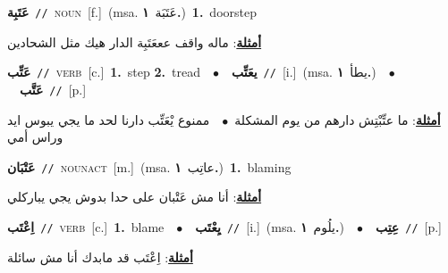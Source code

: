 \documentclass[10pt,a4paper,twoside]{article} %
\begin{document}
\begin{multicols}{2}
{{{{{{{{{{\setlength\topsep{0pt}\textbf{\foreignlanguage{arabic}{عَتَبِة}}\ {\color{gray}\texttt{//}\color{black}}\ \textsc{noun}\ [f.]\ \color{gray}(msa. \foreignlanguage{arabic}{عَتَبَة}~\foreignlanguage{arabic}{\textbf{١.}})\color{black}\ \textbf{1.}~doorstep\  \begin{flushright}\color{gray}\foreignlanguage{arabic}{\textbf{\underline{\foreignlanguage{arabic}{أمثلة}}}: ماله واقف عععَتَبِة الدار هيك مثل الشحادين}\end{flushright}\color{black}} \vspace{2mm}

{\setlength\topsep{0pt}\textbf{\foreignlanguage{arabic}{عَتِّب}}\ {\color{gray}\texttt{//}\color{black}}\ \textsc{verb}\ [c.]\ \textbf{1.}~step  \textbf{2.}~tread\ \ $\bullet$\ \ \setlength\topsep{0pt}\textbf{\foreignlanguage{arabic}{يعَتِّب}}\ {\color{gray}\texttt{//}\color{black}}\ [i.]\ \color{gray}(msa. \foreignlanguage{arabic}{يطأ}~\foreignlanguage{arabic}{\textbf{١.}})\color{black}\ \ $\bullet$\ \ \setlength\topsep{0pt}\textbf{\foreignlanguage{arabic}{عَتَّب}}\ {\color{gray}\texttt{//}\color{black}}\ [p.]\  \begin{flushright}\color{gray}\foreignlanguage{arabic}{\textbf{\underline{\foreignlanguage{arabic}{أمثلة}}}: ما عتِّبْتِش دارهم من يوم المشكلة\ $\bullet$\ \  ممنوع يْعَتِّب دارنا لحد ما يجي يبوس ايد وراس أمي}\end{flushright}\color{black}} \vspace{2mm}

{\setlength\topsep{0pt}\textbf{\foreignlanguage{arabic}{عَتْبَان}}\ {\color{gray}\texttt{//}\color{black}}\ \textsc{noun\textunderscore act}\ [m.]\ \color{gray}(msa. \foreignlanguage{arabic}{عاتِب}~\foreignlanguage{arabic}{\textbf{١.}})\color{black}\ \textbf{1.}~blaming\  \begin{flushright}\color{gray}\foreignlanguage{arabic}{\textbf{\underline{\foreignlanguage{arabic}{أمثلة}}}: أنا مش عَتْبان على حدا بدوش يجي يباركلي}\end{flushright}\color{black}} \vspace{2mm}

{\setlength\topsep{0pt}\textbf{\foreignlanguage{arabic}{اِعْتَب}}\ {\color{gray}\texttt{//}\color{black}}\ \textsc{verb}\ [c.]\ \textbf{1.}~blame\ \ $\bullet$\ \ \setlength\topsep{0pt}\textbf{\foreignlanguage{arabic}{يِعْتَب}}\ {\color{gray}\texttt{//}\color{black}}\ [i.]\ \color{gray}(msa. \foreignlanguage{arabic}{يلُوم}~\foreignlanguage{arabic}{\textbf{١.}})\color{black}\ \ $\bullet$\ \ \setlength\topsep{0pt}\textbf{\foreignlanguage{arabic}{عِتِب}}\ {\color{gray}\texttt{//}\color{black}}\ [p.]\  \begin{flushright}\color{gray}\foreignlanguage{arabic}{\textbf{\underline{\foreignlanguage{arabic}{أمثلة}}}: اِعْتَب قد مابدك أنا مش سائلة}\end{flushright}\color{black}} \vspace{2mm}

}}}}}}}}}
\end{multicols}
\end{document}
